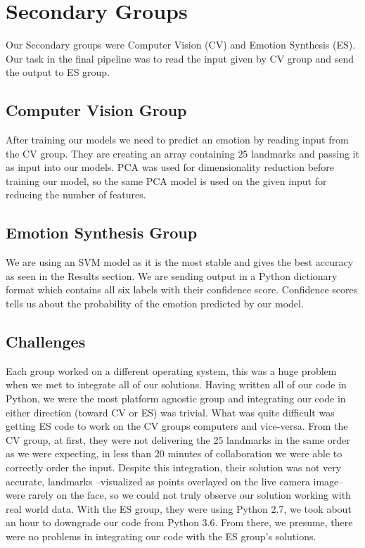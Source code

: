 \section{Secondary Groups}

Our Secondary groups were Computer Vision (CV) and Emotion Synthesis (ES). Our task in the final pipeline was to read the input given by CV group and send the output to ES group.

\subsection{Computer Vision Group}
After training our models we need to predict an emotion by reading input from the CV group. They are creating an array containing $25$ landmarks and passing it as input into our models. PCA was used for dimensionality reduction before training our model, so the same PCA model is used on the given input for reducing the number of features.

\subsection{Emotion Synthesis Group}
We are using an SVM model as it is the most stable and gives the best accuracy as seen in the Results section. We are sending output in a Python dictionary format which contains all six labels with their confidence score. Confidence scores tells us about the probability of the emotion predicted by our model. %

\subsection{Challenges}
Each group worked on a different operating system, this was a huge problem when we met to integrate all of our solutions. Having written all of our code in Python, we were the most platform agnostic group and integrating our code in either direction (toward CV or ES) was trivial. What was quite difficult was getting ES code to work on the CV groups computers and vice-versa. From the CV group, at first, they were not delivering the 25 landmarks in the same order as we were expecting, in less than 20 minutes of collaboration we were able to correctly order the input. Despite this integration, their solution was not very accurate, landmarks --visualized as points overlayed on the live camera image-- were rarely on the face, so we could not truly observe our solution working with real world data. With the ES group, they were using Python 2.7, we took about an hour to downgrade our code from Python 3.6. From there, we presume, there were no problems in integrating our code with the ES group's solutions.
